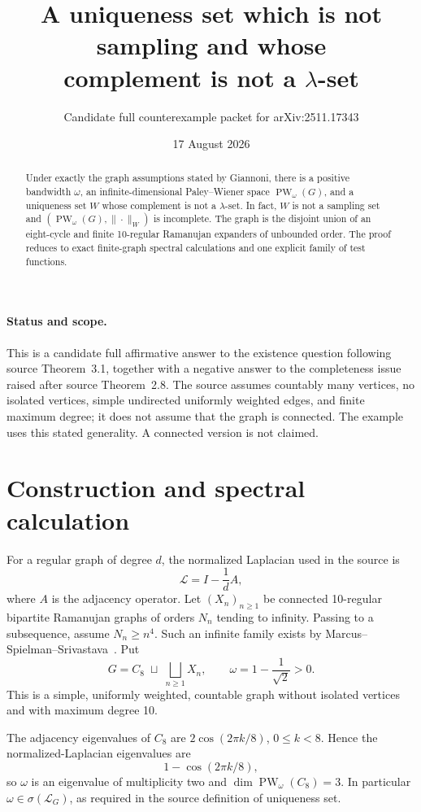 \documentclass[11pt]{article}
\title{A uniqueness set which is not sampling and whose\\
complement is not a \(\lambda\)-set}
\author{Candidate full counterexample packet for arXiv:2511.17343}
\date{17 August 2026}
\newcommand{\PW}{\operatorname{PW}}
\newcommand{\cL}{\mathcal L}
\begin{document}
\maketitle

\begin{abstract}
Under exactly the graph assumptions stated by Giannoni, there is a positive
bandwidth \(\omega\), an infinite-dimensional Paley--Wiener space
\(\PW_\omega(G)\), and a uniqueness set \(W\) whose complement is not a
\(\lambda\)-set.  In fact, \(W\) is not a sampling set and
\((\PW_\omega(G),\|\cdot\|_W)\) is incomplete.  The graph is the disjoint
union of an eight-cycle and finite 10-regular Ramanujan expanders of unbounded
order.  The proof reduces to exact finite-graph spectral calculations and one
explicit family of test functions.
\end{abstract}

\paragraph{Status and scope.}
This is a candidate full affirmative answer to the existence question following
source Theorem~3.1, together with a negative answer to the completeness issue
raised after source Theorem~2.8.  The source assumes countably many vertices,
no isolated vertices, simple undirected uniformly weighted edges, and finite
maximum degree; it does not assume that the graph is connected.  The example
uses this stated generality.  A connected version is not claimed.

\section{Construction and spectral calculation}

For a regular graph of degree \(d\), the normalized Laplacian used in the
source is
\[
  \cL=I-\frac1d A,
\]
where \(A\) is the adjacency operator.  Let \((X_n)_{n\ge1}\) be connected
10-regular bipartite Ramanujan graphs of orders \(N_n\) tending to infinity.
Passing to a subsequence, assume \(N_n\ge n^4\).  Such an infinite family
exists by Marcus--Spielman--Srivastava~\cite{MSS}.  Put
\[
  G=C_8\;\sqcup\;\bigsqcup_{n\ge1}X_n,
  \qquad \omega=1-\frac1{\sqrt2}>0.
\]
This is a simple, uniformly weighted, countable graph without isolated
vertices and with maximum degree 10.

The adjacency eigenvalues of \(C_8\) are
\(2\cos(2\pi k/8)\), \(0\le k<8\).  Hence the normalized-Laplacian
eigenvalues are
\[
  1-\cos(2\pi k/8),
\]
so \(\omega\) is an eigenvalue of multiplicity two and
\(\dim\PW_\omega(C_8)=3\).  In particular \(\omega\in\sigma(\cL_G)\), as
required in the source definition of uniqueness set.
\end{document}
